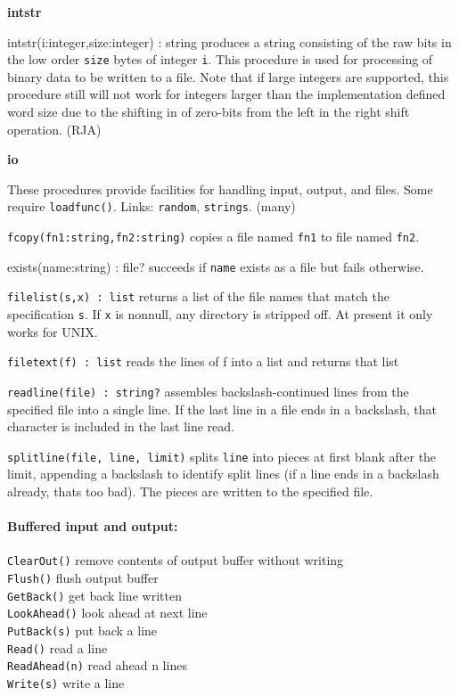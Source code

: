 {\sffamily\bfseries
intstr}

\textsf{intstr(i:integer,size:integer) : string} produces a string
consisting of the raw bits in the low order \texttt{size} bytes of
integer \texttt{i}. This procedure is used for processing of
binary data to be written to a file. Note that if
large integers are supported, this procedure still will not work for
integers larger than the implementation defined word size due to the
shifting in of zero-bits from the left in the right shift operation.
(RJA)

{\sffamily\bfseries
io}

These procedures provide facilities for handling input,
output, and files. Some require
\texttt{loadfunc()}. Links: \texttt{random}, \texttt{strings}. (many)

\texttt{fcopy(fn1:string,fn2:string)} copies a file named \texttt{fn1}
to file named \texttt{fn2}.

\textsf{exists(name:string) : file?} succeeds if \texttt{name} exists as
a file but fails otherwise.

\texttt{filelist(s,x) : list} returns a list of the file names that
match the specification \texttt{s}. If \texttt{x} is nonnull, any
directory is stripped off. At present it only works for UNIX.

\texttt{filetext(f) : list} reads the lines of f into a list and returns
that list

\texttt{readline(file) : string?} assembles backslash-continued lines
from the specified file into a single line. If the last line in a file
ends in a backslash, that character is included in the last line read.

\texttt{splitline(file, line, limit)} splits \texttt{line} into pieces
at first blank after the limit, appending a backslash to identify split
lines (if a line ends in a backslash already, that{\textquotesingle}s
too bad). The pieces are written to the specified file.

\paragraph{Buffered input and output:}
\texttt{ClearOut()} remove contents of output buffer without
writing\\
\texttt{Flush()} flush output buffer\\
\texttt{GetBack()} get back line written\\
\texttt{LookAhead()} look ahead at next line\\
\texttt{PutBack(s)} put back a line\\
\texttt{Read()} read a line\\
\texttt{ReadAhead(n)} read ahead n lines\\
\texttt{Write(s)} write a line

